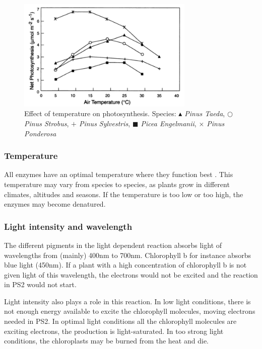 \begin{figure}
\centering
\includegraphics[width=0.75\textwidth]{img/photosynthesis/temperature_new.png}
\caption{Effect of temperature on photosynthesis. Species:
 \textit{\ensuremath{\blacktriangle} Pinus Taeda},  
\textit{\ensuremath{\bigcirc} Pinus Strobus}, 
\textit{\ensuremath{+} Pinus Sylvestris}, 
\textit{\ensuremath{\blacksquare} Picea Engelmanii}, 
\textit{\ensuremath{\times} Pinus Ponderosa}
\citep{hollinger1995external}
}
\label{fig:temperature}
\end{figure}

\subsubsection{Temperature}
All enzymes have an optimal temperature where they function best \citep{bios}. This temperature may vary from species to species, as plants grow in different climates, altitudes and seasons. If the temperature is too low or too high, the enzymes may become denatured.  

\subsubsection{Light intensity and wavelength}
The different pigments in the light dependent reaction absorbs light of wavelengths from (mainly) 400nm to 700nm. Chlorophyll b for instance absorbs blue light (450nm). If a plant with a high concentration of chlorophyll b is not given light of this wavelength, the electrons would not be excited and the reaction in PS2 would not start. 

Light intensity also plays a role in this reaction. In low light conditions, there is not enough energy available to excite the chlorophyll molecules, moving electrons needed in PS2. In optimal light conditions all the chlorophyll molecules are exciting electrons, the production is light-saturated. In too strong light conditions, the chloroplasts may be burned from the heat and die.  

